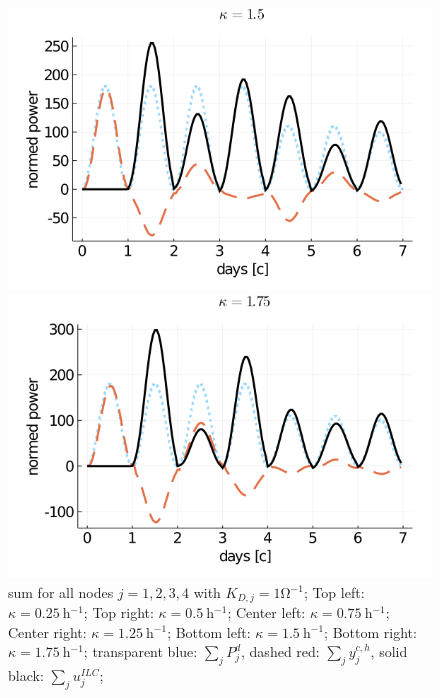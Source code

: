 \begin{figure}[!tbp]
	\centering
	\begin{minipage}[b]{0.475\textwidth}
		\includegraphics[width=\textwidth]{pictures/plots/manual_calc_variation_kappa/kappa_15_energies_sum.png}
		
	\end{minipage}
	\hfill
	\begin{minipage}[b]{0.475\textwidth}
		\includegraphics[width=\textwidth]{pictures/plots/manual_calc_variation_kappa/kappa_175_energies_sum.png}
		
	\end{minipage}
	\caption{sum for all nodes $j = 1,2,3,4$ with $K_{D,j} = 1\si{\ohm ^{-1}}$; Top left: $\kappa = \SI{0.25}{\hour ^{-1}}$; Top right: $\kappa = \SI{0.5}{\hour ^{-1}}$; Center left: $\kappa = \SI{0.75}{\hour ^{-1}}$; Center right: $\kappa = \SI{1.25}{\hour ^{-1}}$; Bottom left: $\kappa = \SI{1.5}{\hour ^{-1}}$; Bottom right: $\kappa = \SI{1.75}{\hour ^{-1}}$; transparent blue: $\sum_{j} P_j^d$, dashed red: $\sum_{j} y_j^{c,h}$, solid black: $\sum_{j}u_j^{ILC}$;}
	\label{fig:kvar_KD1}
\end{figure}
